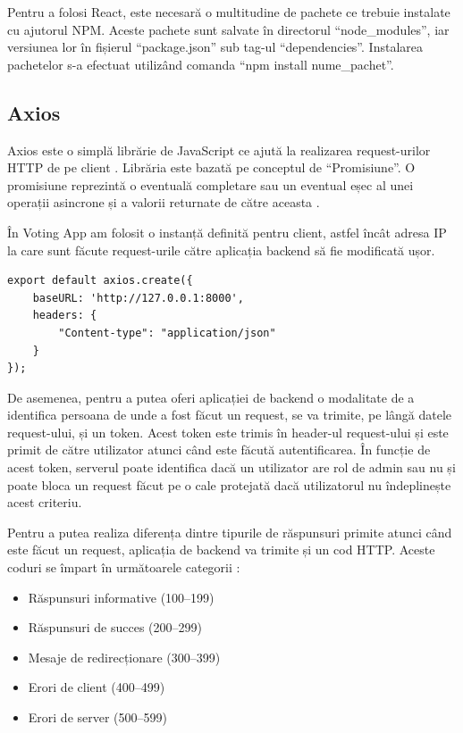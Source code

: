 Pentru a folosi React, este necesară o multitudine de pachete ce trebuie instalate cu ajutorul NPM. Aceste pachete sunt salvate în directorul \enquote{node\_modules}, iar versiunea lor în fișierul \enquote{package{.}json} sub tag-ul \enquote{dependencies}. Instalarea pachetelor s-a efectuat utilizând comanda \enquote{npm install nume\_pachet}.

\subsection{Axios}

Axios este o simplă librărie de JavaScript ce ajută la realizarea request-urilor HTTP de pe client \cite{axios_docs}. Librăria este bazată pe conceptul de \enquote{Promisiune}. O promisiune reprezintă o eventuală completare sau un eventual eșec al unei operații asincrone și a valorii returnate de către aceasta \cite{what_is_promise}.

În Voting App am folosit o instanță definită pentru client, astfel încât adresa IP la care sunt făcute request-urile către aplicația backend să fie modificată ușor.

\begin{code}
\begin{verbatim}
export default axios.create({
    baseURL: 'http://127.0.0.1:8000',
    headers: {
        "Content-type": "application/json"
    }
});
\end{verbatim}
\label{code:axios-code}
\end{code}
\hfill

De asemenea, pentru a putea oferi aplicației de backend o modalitate de a identifica persoana de unde a fost făcut un request, se va trimite, pe lângă datele request-ului, și un token. Acest token este trimis în header-ul request-ului și este primit de către utilizator atunci când este făcută autentificarea. În funcție de acest token, serverul poate identifica dacă un utilizator are rol de admin sau nu și poate bloca un request făcut pe o cale protejată dacă utilizatorul nu îndeplinește acest criteriu.

Pentru a putea realiza diferența dintre tipurile de răspunsuri primite atunci când este făcut un request, aplicația de backend va trimite și un cod HTTP. Aceste coduri se împart în următoarele categorii \cite{http_codes}:

\begin{itemize}
    \item Răspunsuri informative (100–199)
    \item Răspunsuri de succes (200–299)
    \item Mesaje de redirecționare (300–399)
    \item Erori de client (400–499)
    \item Erori de server (500–599)
\end{itemize}

